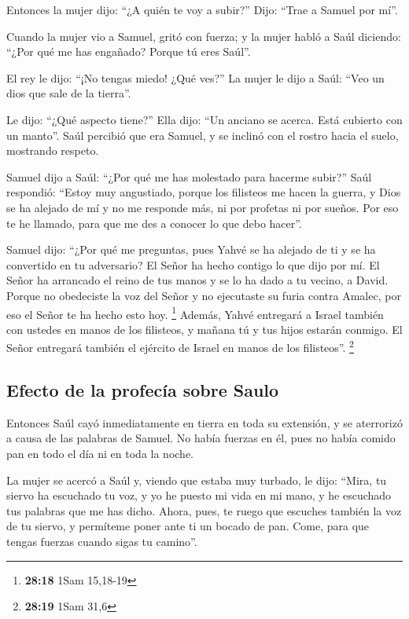  Entonces la mujer dijo: ``¿A quién te voy a subir?''
Dijo: ``Trae a Samuel por mí''.

 Cuando la mujer vio a Samuel, gritó con fuerza; y la
mujer habló a Saúl diciendo: ``¿Por qué me has engañado? Porque tú eres
Saúl''.

 El rey le dijo: ``¡No tengas miedo! ¿Qué ves?'' La mujer
le dijo a Saúl: ``Veo un dios que sale de la tierra''.

 Le dijo: ``¿Qué aspecto tiene?'' Ella dijo: ``Un anciano
se acerca. Está cubierto con un manto''. Saúl percibió que era Samuel, y
se inclinó con el rostro hacia el suelo, mostrando respeto.

 Samuel dijo a Saúl: ``¿Por qué me has molestado para
hacerme subir?'' Saúl respondió: ``Estoy muy angustiado, porque los
filisteos me hacen la guerra, y Dios se ha alejado de mí y no me
responde más, ni por profetas ni por sueños. Por eso te he llamado, para
que me des a conocer lo que debo hacer''.

 Samuel dijo: ``¿Por qué me preguntas, pues Yahvé se ha
alejado de ti y se ha convertido en tu adversario?  El
Señor ha hecho contigo lo que dijo por mí. El Señor ha arrancado el
reino de tus manos y se lo ha dado a tu vecino, a David. 
Porque no obedeciste la voz del Señor y no ejecutaste su furia contra
Amalec, por eso el Señor te ha hecho esto hoy. \footnote{\textbf{28:18}
  1Sam 15,18-19}  Además, Yahvé entregará a Israel
también con ustedes en manos de los filisteos, y mañana tú y tus hijos
estarán conmigo. El Señor entregará también el ejército de Israel en
manos de los filisteos''. \footnote{\textbf{28:19} 1Sam 31,6}

\hypertarget{efecto-de-la-profecuxeda-sobre-saulo}{%
\subsection{Efecto de la profecía sobre
Saulo}\label{efecto-de-la-profecuxeda-sobre-saulo}}

 Entonces Saúl cayó inmediatamente en tierra en toda su
extensión, y se aterrorizó a causa de las palabras de Samuel. No había
fuerzas en él, pues no había comido pan en todo el día ni en toda la
noche.

 La mujer se acercó a Saúl y, viendo que estaba muy
turbado, le dijo: ``Mira, tu siervo ha escuchado tu voz, y yo he puesto
mi vida en mi mano, y he escuchado tus palabras que me has dicho.
 Ahora, pues, te ruego que escuches también la voz de tu
siervo, y permíteme poner ante ti un bocado de pan. Come, para que
tengas fuerzas cuando sigas tu camino''.


